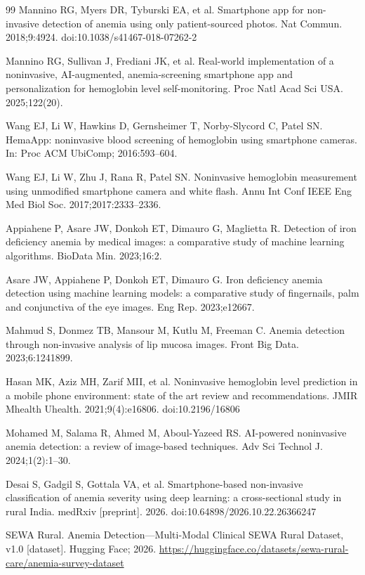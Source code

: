 \documentclass[10pt,a4paper,twocolumn]{article}
\begin{document}
\begin{thebibliography}{99}
 Mannino RG, Myers DR, Tyburski EA, et al. Smartphone app for non-invasive detection of anemia using only patient-sourced photos. Nat Commun. 2018;9:4924. doi:10.1038/s41467-018-07262-2

 Mannino RG, Sullivan J, Frediani JK, et al. Real-world implementation of a noninvasive, AI-augmented, anemia-screening smartphone app and personalization for hemoglobin level self-monitoring. Proc Natl Acad Sci USA. 2025;122(20).

 Wang EJ, Li W, Hawkins D, Gernsheimer T, Norby-Slycord C, Patel SN. HemaApp: noninvasive blood screening of hemoglobin using smartphone cameras. In: Proc ACM UbiComp; 2016:593--604.

 Wang EJ, Li W, Zhu J, Rana R, Patel SN. Noninvasive hemoglobin measurement using unmodified smartphone camera and white flash. Annu Int Conf IEEE Eng Med Biol Soc. 2017;2017:2333--2336.

 Appiahene P, Asare JW, Donkoh ET, Dimauro G, Maglietta R. Detection of iron deficiency anemia by medical images: a comparative study of machine learning algorithms. BioData Min. 2023;16:2.

 Asare JW, Appiahene P, Donkoh ET, Dimauro G. Iron deficiency anemia detection using machine learning models: a comparative study of fingernails, palm and conjunctiva of the eye images. Eng Rep. 2023;e12667.

 Mahmud S, Donmez TB, Mansour M, Kutlu M, Freeman C. Anemia detection through non-invasive analysis of lip mucosa images. Front Big Data. 2023;6:1241899.

 Hasan MK, Aziz MH, Zarif MII, et al. Noninvasive hemoglobin level prediction in a mobile phone environment: state of the art review and recommendations. JMIR Mhealth Uhealth. 2021;9(4):e16806. doi:10.2196/16806

 Mohamed M, Salama R, Ahmed M, Aboul-Yazeed RS. AI-powered noninvasive anemia detection: a review of image-based techniques. Adv Sci Technol J. 2024;1(2):1--30.

 Desai S, Gadgil S, Gottala VA, et al. Smartphone-based non-invasive classification of anemia severity using deep learning: a cross-sectional study in rural India. medRxiv [preprint]. 2026. doi:10.64898/2026.10.22.26366247

 SEWA Rural. Anemia Detection---Multi-Modal Clinical SEWA Rural Dataset, v1.0 [dataset]. Hugging Face; 2026. \url{https://huggingface.co/datasets/sewa-rural-care/anemia-survey-dataset}


\end{thebibliography}
\end{document}
